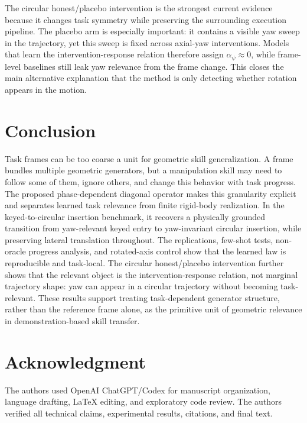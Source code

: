 \documentclass[letterpaper,10pt,conference]{ieeeconf}
\begin{document}
The circular honest/placebo intervention is the strongest current evidence
because it changes task symmetry while preserving the surrounding execution
pipeline. The placebo arm is especially important: it contains a visible yaw
sweep in the trajectory, yet this sweep is fixed across axial-yaw interventions.
Models that learn the intervention-response relation therefore assign
$\alpha_\psi\approx0$, while frame-level baselines still leak yaw relevance
from the frame change. This closes the main alternative explanation that the
method is only detecting whether rotation appears in the motion.

\section{Conclusion}
\label{sec:conclusion}

Task frames can be too coarse a unit for geometric skill generalization. A
frame bundles multiple geometric generators, but a manipulation skill may need
to follow some of them, ignore others, and change this behavior with task
progress. The proposed phase-dependent diagonal operator makes this granularity
explicit and separates learned task relevance from finite rigid-body
realization. In the keyed-to-circular insertion benchmark, it recovers a
physically grounded transition from yaw-relevant keyed entry to yaw-invariant
circular insertion, while preserving lateral translation throughout. The
replications, few-shot tests, non-oracle progress analysis, and rotated-axis
control show that the learned law is reproducible and task-local. The circular
honest/placebo intervention further shows that the relevant object is the
intervention-response relation, not marginal trajectory shape: yaw can appear
in a circular trajectory without becoming task-relevant. These results support
treating task-dependent generator structure, rather than the reference frame
alone, as the primitive unit of geometric relevance in demonstration-based
skill transfer.

\section*{Acknowledgment}
The authors used OpenAI ChatGPT/Codex for manuscript organization, language
drafting, LaTeX editing, and exploratory code review. The authors verified all
technical claims, experimental results, citations, and final text.



\end{document}
